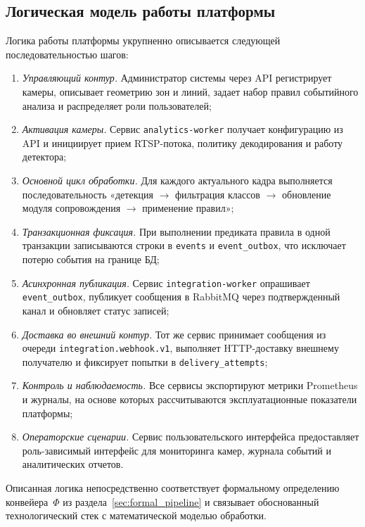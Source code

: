 \subsection{Логическая модель работы платформы}
\label{subsec:logic_model}

Логика работы платформы укрупненно описывается следующей последовательностью шагов:
\begin{enumerate}
    \item \textit{Управляющий контур.} Администратор системы через API регистрирует камеры, описывает геометрию зон и линий, задает набор правил событийного анализа и распределяет роли пользователей;
    \item \textit{Активация камеры.} Сервис \texttt{analytics-worker} получает конфигурацию из API и инициирует прием RTSP-потока, политику декодирования и работу детектора;
    \item \textit{Основной цикл обработки.} Для каждого актуального кадра выполняется последовательность «детекция $\rightarrow$ фильтрация классов $\rightarrow$ обновление модуля сопровождения $\rightarrow$ применение правил»;
    \item \textit{Транзакционная фиксация.} При выполнении предиката правила в одной транзакции записываются строки в \texttt{events} и \texttt{event\_outbox}, что исключает потерю события на границе БД;
    \item \textit{Асинхронная публикация.} Сервис \texttt{integration-worker} опрашивает \texttt{event\_outbox}, публикует сообщения в RabbitMQ через подтвержденный канал и обновляет статус записей;
    \item \textit{Доставка во внешний контур.} Тот же сервис принимает сообщения из очереди \texttt{integration.webhook.v1}, выполняет HTTP-доставку внешнему получателю и фиксирует попытки в \texttt{delivery\_attempts};
    \item \textit{Контроль и наблюдаемость.} Все сервисы экспортируют метрики Prometheus и журналы, на основе которых рассчитываются эксплуатационные показатели платформы;
    \item \textit{Операторские сценарии.} Сервис пользовательского интерфейса предоставляет роль-зависимый интерфейс для мониторинга камер, журнала событий и аналитических отчетов.
\end{enumerate}

Описанная логика непосредственно соответствует формальному определению конвейера~$\Phi$ из раздела~\ref{sec:formal_pipeline} и связывает обоснованный технологический стек с математической моделью обработки.

